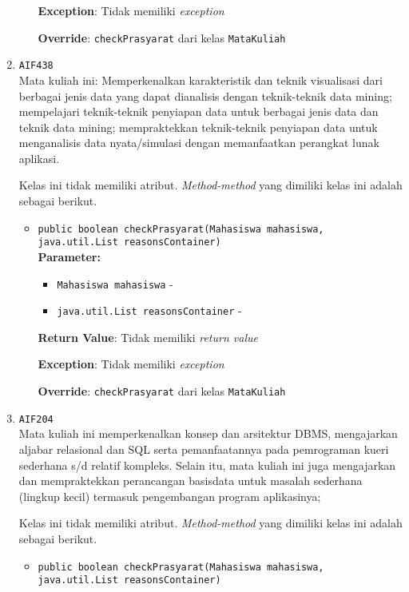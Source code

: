\documentclass{article}
\begin{document}
\begin{enumerate}
\begin{itemize}
\textbf{Exception}: Tidak memiliki \textit{exception}

\textbf{Override}: \texttt{checkPrasyarat} dari kelas \texttt{MataKuliah}

\end{itemize}
\item \texttt{AIF438}\\ 
Mata kuliah ini: Memperkenalkan karakteristik dan teknik visualisasi dari
 berbagai jenis data yang dapat dianalisis dengan teknik-teknik data mining;
 mempelajari teknik-teknik penyiapan data untuk berbagai jenis data dan teknik
 data mining; mempraktekkan teknik-teknik penyiapan data untuk menganalisis
 data nyata/simulasi dengan memanfaatkan perangkat lunak aplikasi.

Kelas ini tidak memiliki atribut. \textit{Method-method} yang dimiliki kelas ini adalah sebagai berikut.
\begin{itemize}
\item \texttt{public boolean checkPrasyarat(Mahasiswa mahasiswa, java.util.List reasonsContainer)}\\ 


\textbf{Parameter:}\begin{itemize}
\item \texttt{Mahasiswa mahasiswa} - 
\item \texttt{java.util.List reasonsContainer} - 
\end{itemize}
\textbf{Return Value}: Tidak memiliki \textit{return value}

\textbf{Exception}: Tidak memiliki \textit{exception}

\textbf{Override}: \texttt{checkPrasyarat} dari kelas \texttt{MataKuliah}

\end{itemize}
\item \texttt{AIF204}\\ 
Mata kuliah ini memperkenalkan konsep dan arsitektur DBMS, mengajarkan 
 aljabar relasional dan SQL serta pemanfaatannya pada pemrograman kueri 
 sederhana s/d relatif kompleks. Selain itu, mata kuliah ini juga mengajarkan 
 dan mempraktekkan perancangan basisdata untuk masalah sederhana 
 (lingkup kecil) termasuk pengembangan program aplikasinya;

Kelas ini tidak memiliki atribut. \textit{Method-method} yang dimiliki kelas ini adalah sebagai berikut.
\begin{itemize}
\item \texttt{public boolean checkPrasyarat(Mahasiswa mahasiswa, java.util.List reasonsContainer)}\\ 



\end{itemize}
\end{enumerate}
\end{document}
